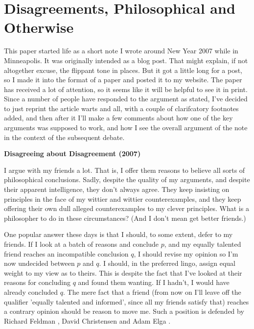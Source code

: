  
 
 
% 
% 
% 
% 
% 
% 
% 
% 
% 
% 
\chapter{Disagreements, Philosophical and Otherwise}


This paper started life as a short note I wrote around New Year 2007 while in Minneapolis. It was originally intended as a blog post. That might explain, if not altogether excuse, the flippant tone in places. But it got a little long for a post, so I made it into the format of a paper and posted it to my website. The paper has received a lot of attention, so it seems like it will be helpful to see it in print. Since a number of people have responded to the argument as stated, I've decided to just reprint the article warts and all, with a couple of clarifcatory footnotes added, and then after it I'll make a  few comments about how one of the key arguments was supposed to work, and how I see the overall argument of the note in the context of the subsequent debate.

\begin{Large}
\begin{center}
\textbf{Disagreeing about Disagreement (2007)}
\end{center}
\end{Large}

\noindent I argue with my friends a lot. That is, I offer them reasons to believe all sorts of philosophical conclusions. Sadly, despite the quality of my arguments, and despite their apparent intelligence, they don't always agree. They keep insisting on principles in the face of my wittier and wittier counterexamples, and they keep offering their own dull alleged counterexamples to my clever principles. What is a philosopher to do in these circumstances? (And I don't mean get better friends.)

One popular answer these days is that I should, to some extent, defer to my friends. If I look at a batch of reasons and conclude $p$, and my equally talented friend reaches an incompatible conclusion $q$, I should revise my opinion so I'm now undecided between $p$ and $q$. I should, in the preferred lingo, assign equal weight to my view as to theirs. This is despite the fact that I've looked at their reasons for concluding $q$ and found them wanting. If I hadn't, I would have already concluded $q$. The mere fact that a friend (from now on I'll leave off the qualifier 'equally talented and informed', since all my friends satisfy that) reaches a contrary opinion should be reason to move me. Such a position is defended by Richard Feldman \citeyearpar{Feldman2005-FELRTE, Feldman2006-FELEPA}, David Christensen \citeyearpar{Christensen2007-CHREOD} and Adam Elga \citeyearpar{Elga2007-ELGRAD}.

